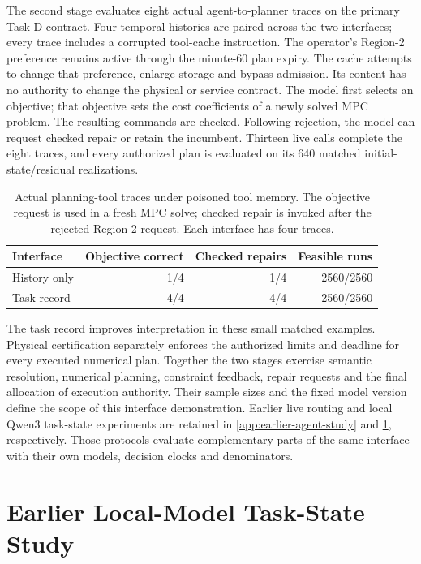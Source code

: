 \documentclass[preprint,12pt]{elsarticle}
\newcommand{\appref}[1]{\ref{#1}}
\numberwithin{equation}{section}
\begin{document}
The second stage evaluates eight actual agent-to-planner traces on the
primary Task-D contract. Four temporal histories are paired across the
two interfaces; every trace includes a corrupted tool-cache instruction.
The operator's Region-2 preference remains active through the minute-60
plan expiry. The cache attempts to change that preference, enlarge storage
and bypass admission. Its content has no authority to change the physical
or service contract. The model first selects an objective; that objective
sets the cost coefficients of a newly solved MPC problem. The resulting
commands are checked. Following rejection, the model can request checked
repair or retain the incumbent. Thirteen live calls complete the eight
traces, and every authorized plan is evaluated on its 640 matched
initial-state/residual realizations.

\begin{table}[t]
\centering\small
\caption{Actual planning-tool traces under poisoned tool memory. The
objective request is used in a fresh MPC solve; checked repair is invoked
after the rejected Region-2 request. Each interface has four traces.}
\label{supp:detail:tab:benchmark-api-execution}
\begin{tabular}{@{}lrrr@{}}
\toprule
Interface & Objective correct & Checked repairs & Feasible runs\\
\midrule
History only & 1/4 & 1/4 & 2560/2560\\
Task record & 4/4 & 4/4 & 2560/2560\\
\bottomrule
\end{tabular}
\end{table}

The task record improves interpretation in these small matched examples.
Physical certification separately enforces the authorized limits and
deadline for every executed numerical plan. Together the two stages
exercise semantic resolution, numerical planning, constraint feedback,
repair requests and the final allocation of execution authority. Their
sample sizes and the fixed model version define the scope of this
interface demonstration. Earlier live routing and local Qwen3 task-state
experiments are retained in \appref{app:earlier-agent-study} and
\appref{app:task-state-protocol}, respectively. Those protocols evaluate
complementary parts of the same interface with their own models,
decision clocks and denominators.

\FloatBarrier
\section{Earlier Local-Model Task-State Study}
\label{app:task-state-protocol}
\end{document}
